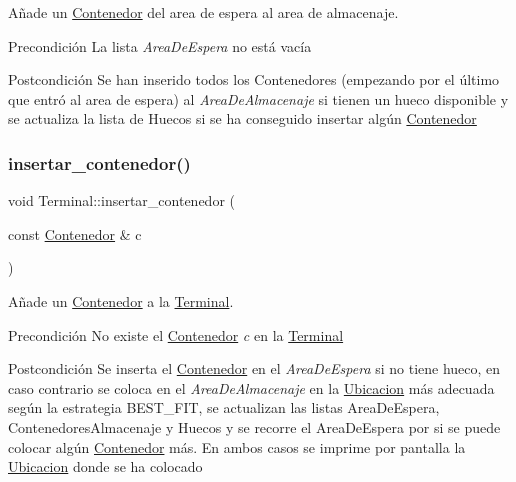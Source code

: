 Añade un \hyperlink{class_contenedor}{Contenedor} del area de espera al area de almacenaje. 

\begin{DoxyPrecond}{Precondición}
La lista {\itshape Area\+De\+Espera} no está vacía 
\end{DoxyPrecond}
\begin{DoxyPostcond}{Postcondición}
Se han inserido todos los Contenedores (empezando por el último que entró al area de espera) al {\itshape Area\+De\+Almacenaje} si tienen un hueco disponible y se actualiza la lista de Huecos si se ha conseguido insertar algún \hyperlink{class_contenedor}{Contenedor} 
\end{DoxyPostcond}
\mbox{\label{class_terminal_a0448a45cc3dea91ab383c79246c9e50e}} 
\subsubsection{\texorpdfstring{insertar\+\_\+contenedor()}{insertar\_contenedor()}}
{\footnotesize\ttfamily void Terminal\+::insertar\+\_\+contenedor (\begin{DoxyParamCaption}\item[{const \hyperlink{class_contenedor}{Contenedor} \&}]{c }\end{DoxyParamCaption})}



Añade un \hyperlink{class_contenedor}{Contenedor} a la \hyperlink{class_terminal}{Terminal}. 

\begin{DoxyPrecond}{Precondición}
No existe el \hyperlink{class_contenedor}{Contenedor} {\itshape c} en la \hyperlink{class_terminal}{Terminal} 
\end{DoxyPrecond}
\begin{DoxyPostcond}{Postcondición}
Se inserta el \hyperlink{class_contenedor}{Contenedor} en el {\itshape Area\+De\+Espera} si no tiene hueco, en caso contrario se coloca en el {\itshape Area\+De\+Almacenaje} en la \hyperlink{class_ubicacion}{Ubicacion} más adecuada según la estrategia B\+E\+S\+T\+\_\+\+F\+IT, se actualizan las listas Area\+De\+Espera, Contenedores\+Almacenaje y Huecos y se recorre el Area\+De\+Espera por si se puede colocar algún \hyperlink{class_contenedor}{Contenedor} más. En ambos casos se imprime por pantalla la \hyperlink{class_ubicacion}{Ubicacion} donde se ha colocado 
\end{DoxyPostcond}
\mbox{\label{class_terminal_a4a5b00174efb9993ead60369d206375b}} 
